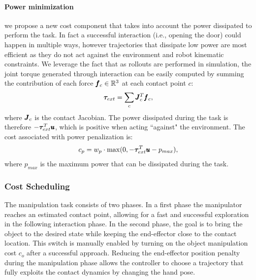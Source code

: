 \paragraph{Power minimization} we propose a new cost component that takes into account the power dissipated to perform the task. In fact a successful interaction (i.e., opening the door) could happen in multiple ways, however trajectories that dissipate low power are most efficient as they do not act against the environment and robot kinematic constraints. We leverage the fact that as rollouts are performed in simulation, the joint torque generated through interaction can be easily computed by summing the contribution of each force $\pmb{f}_c \in \mathbb{R}^{3}$ at each contact point $c$:
\begin{equation}
\boldsymbol{\tau}_{ext} = \sum\limits_{c} \pmb{J}_c^T \pmb{f}_c,    
\end{equation}
where $\pmb{J}_c$ is the contact Jacobian. The power dissipated during the task is therefore $-\boldsymbol{\tau}_{ext}^T\pmb{u}$, which is positive when acting ``against" the environment. The cost associated with power penalization is:
\begin{equation}
   c_p = w_{p} \cdot \max(0, - \boldsymbol{\tau}_{ext}^T\pmb{u} - p_{max}),      
 \end{equation}
where $p_{max}$ is the maximum power that can be dissipated during the task.

\subsubsection{Cost Scheduling}
The manipulation task consists of two phases. In a first phase the manipulator reaches an estimated contact point, allowing for a fast and successful exploration in the following interaction phase. In the second phase, the goal is to bring the object to the desired state while keeping the end-effector close to the contact location. This switch is manually enabled by turning on the object manipulation cost $c_o$ after a successful approach. Reducing the end-effector position penalty during the manipulation phase allows the controller to choose a trajectory that fully exploits the contact dynamics by changing the hand pose.


